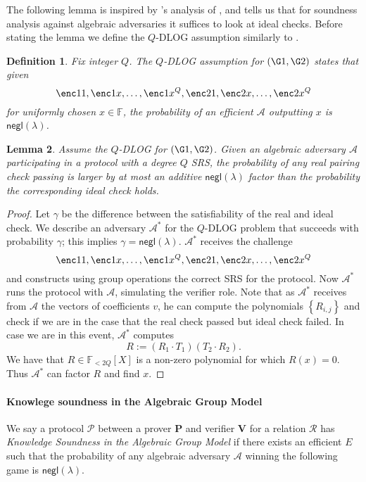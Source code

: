 \documentclass[11pt]{article} %
\newcommand{\F}{\ensuremath{\mathbb F}\xspace}
\newcommand{\adv}{\ensuremath{\mathcal A}\xspace}
\newcommand{\negl}{\ensuremath{\mathsf{negl}(\lambda)}\xspace}
\newcommand{\defeq}{:=}
\newcommand{\prv}{\ensuremath{\mathsf{\mathbf{P}}}\xspace}
\newcommand{\ver}{\ensuremath{\mathsf{\mathbf{V}}}\xspace}
\newcommand{\rel}{\ensuremath{\mathcal{R}}\xspace}
\newcommand{\ext}{\ensuremath{E}\xspace}
\newcommand{\advv}{\ensuremath{ {\mathcal A}^{\mathbf{*}}}\xspace} %
\newcommand{\set}[1]{\ensuremath{\left\{#1\right\}}\xspace}
\newcommand{\polysofdeg}[1]{\ensuremath{\F_{< #1}[X]}\xspace}
\newcommand{\prot}{\ensuremath{\mathscr{P}}\xspace}
\newtheorem{lemma}{Lemma}[section]
\newtheorem{dfn}[lemma]{Definition}
\begin{document}
The following lemma is inspired by \cite{AGM}'s analysis of \cite{Groth16},
and tells us that for soundness analysis against algebraic adversaries it suffices to look at ideal checks.
Before stating the lemma we define the $Q$-DLOG assumption similarly to \cite{AGM}.
\begin{dfn}\label{ref:qdlog}
 Fix integer $Q$. The \emph{$Q$-DLOG assumption for $(\G1,\G2)$} states that given 
 \[\enc1{1},\enc1{x},\ldots,\enc1{x^Q},\enc2{1},\enc2{x},\ldots,\enc2{x^Q}\]
 for uniformly chosen $x\in \F$, the probability of an efficient \adv outputting $x$
 is \negl.
\end{dfn}


\begin{lemma}\label{lem:AGManalysis}
Assume the $Q$-DLOG for $(\G1,\G2)$.
 Given an algebraic adversary \adv participating in a protocol with a degree $Q$ SRS,
 the probability of any real pairing check passing is larger by at most an additive \negl factor than the probability the corresponding ideal check holds.
\end{lemma}
\begin{proof}
 Let $\gamma$ be the difference between the satisfiability of the real and ideal check.
 We describe an adversary \advv for the $Q$-DLOG problem that succeeds with probability $\gamma$; this implies $\gamma=\negl$.
 \advv receives the challenge 
 \[\enc1{1},\enc1{x},\ldots,\enc1{x^Q},\enc2{1},\enc2{x},\ldots,\enc2{x^Q}\]
and constructs using group operations the correct SRS for the protocol.
 Now \advv runs the protocol with \adv, simulating the verifier role. Note that as \advv receives from \adv the vectors of coefficients $v$, he can compute the polynomials \set{R_{i,j}} and check if we are in the case that the real check passed but ideal check failed.
 In case we are in this event, \advv computes
 \[R\defeq (R_1 \cdot T_1)(T_2\cdot R_2). \]
 We have that $R\in\polysofdeg{2Q}$ is a non-zero polynomial for which
 $R(x)=0$. Thus \advv can factor $R$ and find $x$.
\end{proof}


\paragraph{Knowlege soundness in the Algebraic Group Model}
We say a protocol \prot between a prover \prv and verifier \ver for a relation \rel has \emph{Knowledge Soundness in the Algebraic Group Model} if there exists an efficient \ext such that
the probability of any algebraic adversary \adv winning the following game is \negl.
\end{document}
